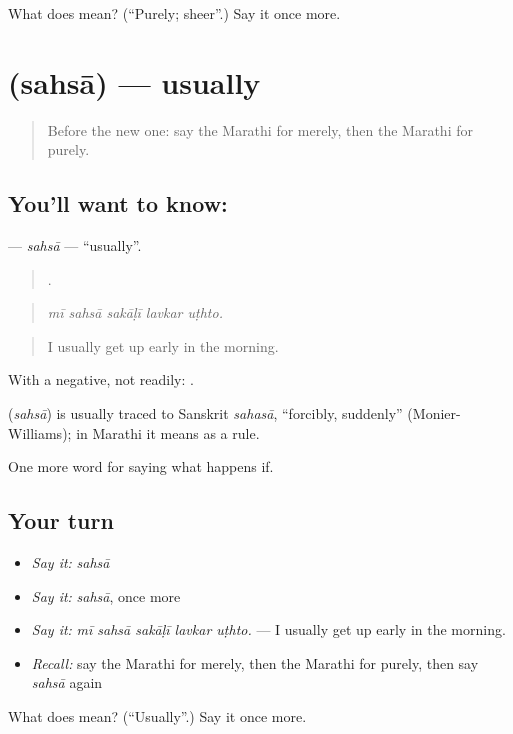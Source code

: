\begin{tcolorbox}[breakable,colback=teal!4,colframe=teal!35!black,title={Before you move on}]
What does  mean? (\textquotedblleft{}Purely; sheer\textquotedblright{}.) Say it once more.
\end{tcolorbox}
\section[\texorpdfstring{\mr{सहसा} (sahsā)}{सहसा (sahsā)}]{ (sahsā) — usually}

\label{lesson:MR-C389-sahsa}



\begin{quote}
Before the new one: say the Marathi for merely, then the Marathi for purely.
\end{quote}

\subsection*{You'll want to know: }
\textbf{} — \emph{sahsā} — \textquotedblleft{}usually\textquotedblright{}.

\begin{quote}
    .
\end{quote}

\begin{quote}
\emph{mī sahsā sakāḷī lavkar uṭhto.}
\end{quote}

\begin{quote}
I usually get up early in the morning.
\end{quote}

With a negative, not readily:    .

\begin{cousinweb}
\textbf{} (\emph{sahsā}) is usually traced to Sanskrit \emph{sahasā}, \textquotedblleft{}forcibly, suddenly\textquotedblright{} (Monier-Williams); in Marathi it means as a rule.
\end{cousinweb}

\begin{grammarlens}[title={What you've built}]
One more word for saying what happens if.
\end{grammarlens}

\subsection*{Your turn}
\begin{itemize}
\raggedright
  \item \emph{Say it:} \emph{sahsā}
  \item \emph{Say it:} \emph{sahsā}, once more
  \item \emph{Say it:} \emph{mī sahsā sakāḷī lavkar uṭhto.} — I usually get up early in the morning.
  \item \emph{Recall:} say the Marathi for merely, then the Marathi for purely, then say \emph{sahsā} again
\end{itemize}

\begin{tcolorbox}[breakable,colback=teal!4,colframe=teal!35!black,title={Before you move on}]
What does  mean? (\textquotedblleft{}Usually\textquotedblright{}.) Say it once more.
\end{tcolorbox}
